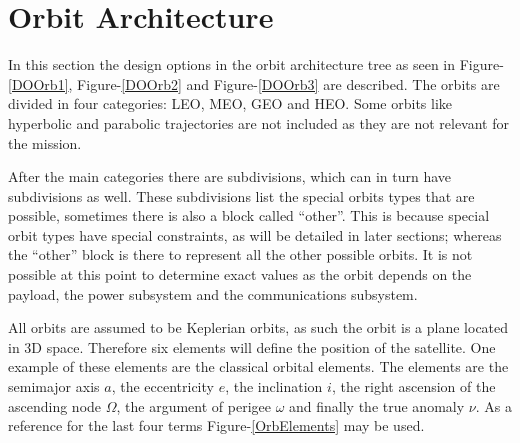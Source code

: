 \section{Orbit Architecture}
\label{blDOOrb}
In this section the design options in the orbit architecture tree as seen in Figure-\ref{DOOrb1}, Figure-\ref{DOOrb2} and Figure-\ref{DOOrb3} are described. The orbits are divided in four categories: \ac{LEO}, \ac{MEO}, \ac{GEO} and \ac{HEO}. Some orbits like hyperbolic and parabolic trajectories are not included as they are not relevant for the mission.

After the main categories there are subdivisions, which can in turn have subdivisions as well. These subdivisions list the special orbits types that are possible, sometimes there is also a block called ``other''. This is because special orbit types have special constraints, as will be detailed in later sections; whereas the ``other'' block is there to represent all the other possible orbits. It is not possible at this point to determine exact values as the orbit depends on the payload, the power subsystem and the communications subsystem.

All orbits are assumed to be Keplerian orbits, as such the orbit is a plane located in 3D space. Therefore six elements will define the position of the satellite. One example of these elements are the classical orbital elements. The elements are the semimajor axis $a$, the eccentricity $e$, the inclination $i$, the right ascension of the ascending node $\Omega$, the argument of perigee $\omega$ and finally the true anomaly $\nu$. As a reference for the last four terms Figure-\ref{OrbElements} may be used.

